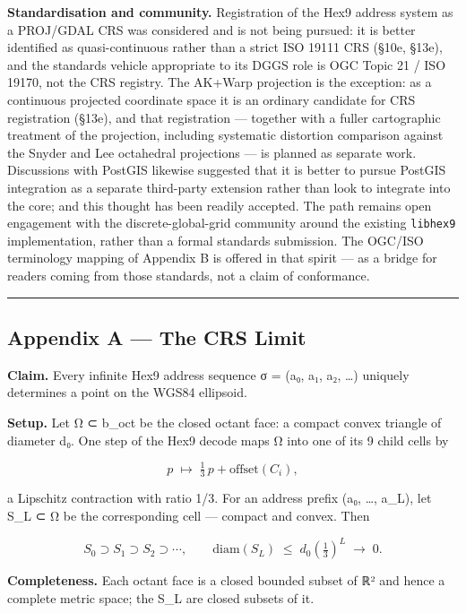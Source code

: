\documentclass[
  11pt,
  a4paper,
]{article}
\begin{document}
\textbf{Standardisation and community.} Registration of the Hex9 address
system as a PROJ/GDAL CRS was considered and is not being pursued: it is
better identified as quasi-continuous rather than a strict ISO 19111 CRS
(§10e, §13e), and the standards vehicle appropriate to its DGGS role is
OGC Topic 21 / ISO 19170, not the CRS registry. The AK+Warp projection
is the exception: as a continuous projected coordinate space it is an
ordinary candidate for CRS registration (§13e), and that registration
--- together with a fuller cartographic treatment of the projection,
including systematic distortion comparison against the Snyder and Lee
octahedral projections --- is planned as separate work. Discussions with
PostGIS likewise suggested that it is better to pursue PostGIS
integration as a separate third-party extension rather than look to
integrate into the core; and this thought has been readily accepted. The
path remains open engagement with the discrete-global-grid community
around the existing \texttt{libhex9} implementation, rather than a
formal standards submission. The OGC/ISO terminology mapping of Appendix
B is offered in that spirit --- as a bridge for readers coming from
those standards, not a claim of conformance.

\begin{center}\rule{0.5\linewidth}{0.5pt}\end{center}

\subsection{Appendix A --- The CRS
Limit}\label{appendix-a-the-crs-limit}

\textbf{Claim.} Every infinite Hex9 address sequence σ = (a₀, a₁, a₂,
\ldots) uniquely determines a point on the WGS84 ellipsoid.

\textbf{Setup.} Let Ω ⊂ b\_oct be the closed octant face: a compact
convex triangle of diameter d₀. One step of the Hex9 decode maps Ω into
one of its 9 child cells by

\[p \;\mapsto\; \tfrac{1}{3}\,p + \mathrm{offset}(C_i),\]

a Lipschitz contraction with ratio 1/3. For an address prefix (a₀,
\ldots, a\_L), let S\_L ⊂ Ω be the corresponding cell --- compact and
convex. Then

\[S_0 \supset S_1 \supset S_2 \supset \cdots, \qquad
  \mathrm{diam}(S_L) \;\leq\; d_0 \left(\tfrac{1}{3}\right)^{L} \;\to\; 0.\]

\textbf{Completeness.} Each octant face is a closed bounded subset of ℝ²
and hence a complete metric space; the S\_L are closed subsets of it.
\end{document}
